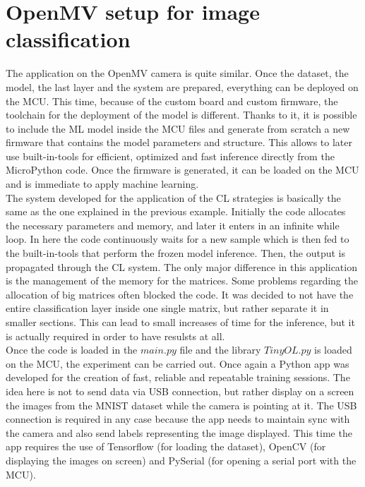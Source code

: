 \documentclass[12pt]{report}
\begin{document}
\section{OpenMV setup for image classification}
The application on the OpenMV camera is quite similar. Once the dataset, the model, the last layer and the system are prepared, everything can be deployed on the MCU. This time, because of the custom board and custom firmware, the toolchain for the deployment of the model is different. Thanks to it, it is possible to include the ML model inside the MCU files and generate from scratch a new firmware that contains the model parameters and structure. This allows to later use built-in-tools for efficient, optimized and fast inference directly from the MicroPython code. Once the firmware is generated, it can be loaded on the MCU and is immediate to apply machine learning.\\
The system developed for the application of the CL strategies is basically the same as the one explained in the previous example. Initially the code allocates the necessary parameters and memory, and later it enters in an infinite while loop. In here the code continuously waits for a new sample which is then fed to the built-in-tools that perform the frozen model inference. Then, the output is propagated through the CL system. The only major difference in this application is the management of the memory for the matrices. Some problems regarding the allocation of big matrices often blocked the code. It was decided to not have the entire classification layer inside one single matrix, but rather separate it in smaller sections. This can lead to small increases of time for the inference, but it is actually required in order to have resulsts at all. \\
Once the code is loaded in the $main.py$ file and the library $TinyOL.py$ is loaded on the MCU, the experiment can be carried out. Once again a Python app was developed for the creation of fast, reliable and repeatable training sessions. The idea here is not to send data via USB connection, but rather display on a screen the images from the MNIST dataset while the camera is pointing at it. The USB connection is required in any case because the app needs to maintain sync with the camera and also send labels representing the image displayed. This time the app requires the use of Tensorflow (for loading the dataset), OpenCV (for displaying the images on screen) and PySerial (for opening a serial port with the MCU). \\
\end{document}
